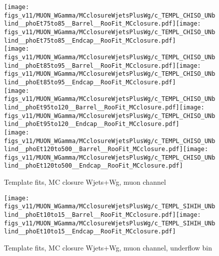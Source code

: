 \begin{figure}[htb]
  \begin{center}
   \texttt{[image: figs\_v11/MUON\_WGamma/MCclosureWjetsPlusWg/c\_TEMPL\_CHISO\_UNblind\_\_phoEt75to85\_\_Barrel\_\_RooFit\_MCclosure.pdf]}\texttt{[image: figs\_v11/MUON\_WGamma/MCclosureWjetsPlusWg/c\_TEMPL\_CHISO\_UNblind\_\_phoEt75to85\_\_Endcap\_\_RooFit\_MCclosure.pdf]}\\
   \texttt{[image: figs\_v11/MUON\_WGamma/MCclosureWjetsPlusWg/c\_TEMPL\_CHISO\_UNblind\_\_phoEt85to95\_\_Barrel\_\_RooFit\_MCclosure.pdf]}\texttt{[image: figs\_v11/MUON\_WGamma/MCclosureWjetsPlusWg/c\_TEMPL\_CHISO\_UNblind\_\_phoEt85to95\_\_Endcap\_\_RooFit\_MCclosure.pdf]}\\
   \texttt{[image: figs\_v11/MUON\_WGamma/MCclosureWjetsPlusWg/c\_TEMPL\_CHISO\_UNblind\_\_phoEt95to120\_\_Barrel\_\_RooFit\_MCclosure.pdf]}\texttt{[image: figs\_v11/MUON\_WGamma/MCclosureWjetsPlusWg/c\_TEMPL\_CHISO\_UNblind\_\_phoEt95to120\_\_Endcap\_\_RooFit\_MCclosure.pdf]}\\
   \texttt{[image: figs\_v11/MUON\_WGamma/MCclosureWjetsPlusWg/c\_TEMPL\_CHISO\_UNblind\_\_phoEt120to500\_\_Barrel\_\_RooFit\_MCclosure.pdf]}\texttt{[image: figs\_v11/MUON\_WGamma/MCclosureWjetsPlusWg/c\_TEMPL\_CHISO\_UNblind\_\_phoEt120to500\_\_Endcap\_\_RooFit\_MCclosure.pdf]}\\
  \label{fig:templateFits_MCclosureWjetsPlusWg_CHISO_MUON_3}
  \caption{Template fits, MC closure Wjets+Wg, muon channel}
  \end{center}
\end{figure}

\begin{figure}[htb]
  \begin{center}
   \texttt{[image: figs\_v11/MUON\_WGamma/MCclosureWjetsPlusWg/c\_TEMPL\_SIHIH\_UNblind\_\_phoEt10to15\_\_Barrel\_\_RooFit\_MCclosure.pdf]}\texttt{[image: figs\_v11/MUON\_WGamma/MCclosureWjetsPlusWg/c\_TEMPL\_SIHIH\_UNblind\_\_phoEt10to15\_\_Endcap\_\_RooFit\_MCclosure.pdf]}\\
  \label{fig:templateFits_MCclosureWjetsPlusWg_SIHIH_MUON_0}
  \caption{Template fits, MC closure Wjets+Wg, muon channel, underflow bin}
  \end{center}
\end{figure}

\

